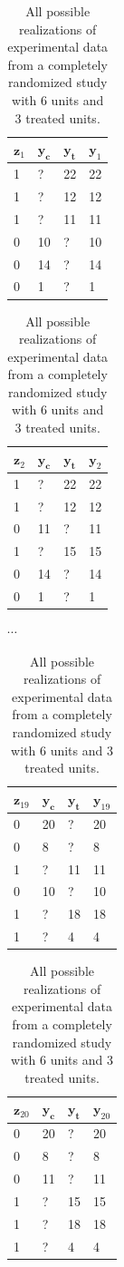 \documentclass[12pt,leqno]{article}
\theoremstyle{newstyle}
\begin{document}
\begin{table}[H]
\scriptsize
    \begin{tabular}{l|l|l|l|}
    $\mathbf{z}_1$ & $\mathbf{y_c}$ & $\mathbf{y_t}$ & $\mathbf{y}_1$ \\ \midrule
    1 & ?  & 22  & 22 \\
    1 & ?  & 12  & 12 \\
    1 & ?  & 11  & 11 \\
    0 & 10 & ?   & 10 \\
    0 & 14 & ?   & 14 \\
    0 &  1 & ?   &  1 \\
    \end{tabular}
    \hfill
      \begin{tabular}{l|l|l|l|}
    $\mathbf{z}_2$ & $\mathbf{y_c}$ & $\mathbf{y_t}$ & $\mathbf{y}_2$ \\ \midrule
    1 &  ? & 22 & 22 \\
    1 &  ? & 12 & 12 \\
    0 & 11 & ?  & 11 \\
    1 & ?  & 15 & 15 \\
    0 & 14 & ?  & 14 \\
    0 &  1 & ?  &  1 \\
    \end{tabular}
     \hfill
     $\cdots $
     \hfill
      \begin{tabular}{l|l|l|l|}
    $\mathbf{z}_{19}$ & $\mathbf{y_c}$ & $\mathbf{y_t}$ & $\mathbf{y}_{19}$ \\ \midrule
    0 & 20 & ?  & 20 \\
    0 &  8 & ?  &  8 \\
    1 &  ? & 11 & 11 \\
    0 & 10 & ?  & 10 \\
    1 & ?  & 18 & 18 \\
    1 & ?  &  4 &  4 \\
    \end{tabular}
     \hfill
      \begin{tabular}{l|l|l|l|}
    $\mathbf{z}_{20}$ & $\mathbf{y_c}$ & $\mathbf{y_t}$ & $\mathbf{y}_{20}$ \\ \midrule
    0 & 20 & ?  & 20 \\
    0 &  8 & ?  &  8 \\
    0 & 11 & ?  & 11 \\
    1 & ?  & 15 & 15 \\
    1 & ?  & 18 & 18 \\
    1 & ?  &  4 &  4 \\
    \end{tabular}
    \caption{All possible realizations of experimental data from a completely randomized study with 6 units and 3 treated units.}
\label{tab: outcomes of experiment}
\end{table}
\end{document}

